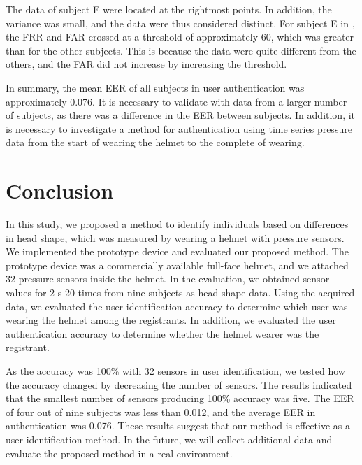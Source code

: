 \documentclass[english,preprint,JIP]{ipsj}
\begin{document}
The data of subject E were located at the rightmost points. In addition, the variance was small, and the data were thus considered distinct. For subject E in , the FRR and FAR crossed at a threshold of approximately 60, which was greater than for the other subjects. This is because the data were quite different from the others, and the FAR did not increase by increasing the threshold.\par

In summary, the mean EER of all subjects in user authentication was approximately 0.076. It is necessary to validate with data from a larger number of subjects, as there was a difference in the EER between subjects. In addition, it is necessary to investigate a method for authentication using time series pressure data from the start of wearing the helmet to the complete of wearing.



\section{Conclusion}
\label{sec:conclusion}
In this study, we proposed a method to identify individuals based on differences in head shape, which was measured by wearing a helmet with pressure sensors. We implemented the prototype device and evaluated our proposed method. The prototype device was a commercially available full-face helmet, and we attached 32 pressure sensors inside the helmet. In the evaluation, we obtained sensor values for 2 s 20 times from nine subjects as head shape data. Using the acquired data, we evaluated the user identification accuracy to determine which user was wearing the helmet among the registrants. In addition, we evaluated the user authentication accuracy to determine whether the helmet wearer was the registrant.\par

As the accuracy was 100\% with 32 sensors in user identification, we tested how the accuracy changed by decreasing the number of sensors. The results indicated that the smallest number of sensors producing 100\% accuracy was five. The EER of four out of nine subjects was less than 0.012, and the average EER in authentication was 0.076. These results suggest that our method is effective as a user identification method. In the future, we will collect additional data and evaluate the proposed method in a real environment.





\end{document}
